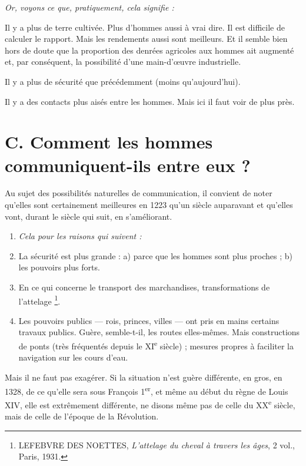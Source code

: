 \documentclass[french,twoside]{book} %
\newlength{\listmod}
\newcommand{\listhead}[1]{\hspace{-1\listmod}\emph{#1}}
\begin{document}
\begin{listalpha}[itemsep=0pt,]
\item[]\listhead{Or, voyons ce que, pratiquement, cela signifie :}
\item Il y a plus de terre cultivée. Plus d’hommes aussi à vrai dire. Il est difficile de calculer le rapport. Mais les rendements aussi sont meilleurs. Et il semble bien hors de doute que la proportion des denrées agricoles aux hommes ait augmenté et, par conséquent, la possibilité d’une main-d’œuvre industrielle.
\item Il y a plus de sécurité que précédemment (moins qu’aujourd’hui).
\item Il y a des contacts plus aisés entre les hommes. Mais ici il faut voir de plus près.

\end{listalpha}\section[C. Comment les hommes communiquent-ils entre eux ?]{C. Comment les hommes communiquent-ils entre eux ?}
\label{c02c}
\noindent  {}
\label{p10} Au sujet des possibilités naturelles de communication, il convient de noter qu’elles sont certainement meilleures en 1223 qu’un siècle auparavant et qu’elles vont, durant le siècle qui suit, en s’améliorant.\par

\begin{enumerate}[itemsep=0pt,]
\item[]\listhead{Cela pour les raisons qui suivent :}
\item La sécurité est plus grande : a) parce que les hommes sont plus proches ; b) les pouvoirs plus forts.
\item En ce qui concerne le transport des marchandises, transformations de l’attelage \footnote{ LEFEBVRE DES NOETTES, {\itshape L’attelage du cheval à travers les âges}, 2 vol., Paris, 1931.}.
\item Les pouvoirs publics — rois, princes, villes — ont pris en mains certains travaux publics. Guère, semble-t-il, les routes elles-mêmes. Mais constructions de ponts (très fréquentés depuis le XI\textsuperscript{e} siècle) ; mesures propres à faciliter la navigation sur les cours d’eau.

\end{enumerate}\noindent Mais il ne faut pas exagérer. Si la situation n’est guère différente, en gros, en 1328, de ce qu’elle sera sous François 1\textsuperscript{er}, et même au début du règne de Louis XIV, elle est extrêmement différente, ne disons même pas de celle du XX\textsuperscript{e} siècle, mais de celle de l’époque de la Révolution.\par
\end{document}
